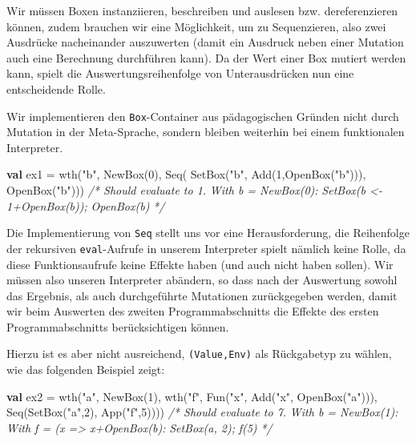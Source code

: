 \documentclass[]{article}
\newenvironment{Shaded}{}{}
\newcommand{\CommentTok}[1]{\textcolor[rgb]{0.38,0.63,0.69}{\textit{#1}}}
\newcommand{\DecValTok}[1]{\textcolor[rgb]{0.25,0.63,0.44}{#1}}
\newcommand{\FunctionTok}[1]{\textcolor[rgb]{0.02,0.16,0.49}{#1}}
\newcommand{\KeywordTok}[1]{\textcolor[rgb]{0.00,0.44,0.13}{\textbf{#1}}}
\newcommand{\NormalTok}[1]{#1}
\newcommand{\StringTok}[1]{\textcolor[rgb]{0.25,0.44,0.63}{#1}}
\begin{document}
Wir müssen Boxen instanziieren, beschreiben und auslesen bzw.
dereferenzieren können, zudem brauchen wir eine Möglichkeit, um zu
Sequenzieren, also zwei Ausdrücke nacheinander auszuwerten (damit ein
Ausdruck neben einer Mutation auch eine Berechnung durchführen kann). Da
der Wert einer Box mutiert werden kann, spielt die
Auswertungsreihenfolge von Unterausdrücken nun eine entscheidende Rolle.

Wir implementieren den \texttt{Box}-Container aus pädagogischen Gründen
nicht durch Mutation in der Meta-Sprache, sondern bleiben weiterhin bei
einem funktionalen Interpreter.

\begin{Shaded}
\begin{Highlighting}[]
\KeywordTok{val}\NormalTok{ ex1 = }\FunctionTok{wth}\NormalTok{(}\StringTok{"b"}\NormalTok{, }\FunctionTok{NewBox}\NormalTok{(}\DecValTok{0}\NormalTok{), Seq( }\FunctionTok{SetBox}\NormalTok{(}\StringTok{"b"}\NormalTok{, }\FunctionTok{Add}\NormalTok{(}\DecValTok{1}\NormalTok{,}\FunctionTok{OpenBox}\NormalTok{(}\StringTok{"b"}\NormalTok{))), }\FunctionTok{OpenBox}\NormalTok{(}\StringTok{"b"}\NormalTok{)))}
\CommentTok{/* Should evaluate to 1.}
\CommentTok{With b = NewBox(0):}
\CommentTok{  SetBox(b \textless{}{-} 1+OpenBox(b));}
\CommentTok{    OpenBox(b)}
\CommentTok{ */}
\end{Highlighting}
\end{Shaded}

Die Implementierung von \texttt{Seq} stellt uns vor eine
Herausforderung, die Reihenfolge der rekursiven \texttt{eval}-Aufrufe in
unserem Interpreter spielt nämlich keine Rolle, da diese
Funktionsaufrufe keine Effekte haben (und auch nicht haben sollen). Wir
müssen also unseren Interpreter abändern, so dass nach der Auswertung
sowohl das Ergebnis, als auch durchgeführte Mutationen zurückgegeben
werden, damit wir beim Auswerten des zweiten Programmabschnitts die
Effekte des ersten Programmabschnitts berücksichtigen können.

Hierzu ist es aber nicht ausreichend, \texttt{(Value,Env)} als
Rückgabetyp zu wählen, wie das folgenden Beispiel zeigt:

\begin{Shaded}
\begin{Highlighting}[]
\KeywordTok{val}\NormalTok{ ex2 = }\FunctionTok{wth}\NormalTok{(}\StringTok{"a"}\NormalTok{, }\FunctionTok{NewBox}\NormalTok{(}\DecValTok{1}\NormalTok{), }
            \FunctionTok{wth}\NormalTok{(}\StringTok{"f"}\NormalTok{, }\FunctionTok{Fun}\NormalTok{(}\StringTok{"x"}\NormalTok{, }\FunctionTok{Add}\NormalTok{(}\StringTok{"x"}\NormalTok{, }\FunctionTok{OpenBox}\NormalTok{(}\StringTok{"a"}\NormalTok{))),}
\NormalTok{              Seq(}\FunctionTok{SetBox}\NormalTok{(}\StringTok{"a"}\NormalTok{,}\DecValTok{2}\NormalTok{), }\FunctionTok{App}\NormalTok{(}\StringTok{"f"}\NormalTok{,}\DecValTok{5}\NormalTok{))))}
\CommentTok{/* Should evaluate to 7.}
\CommentTok{With b = NewBox(1):}
\CommentTok{  With f = (x =\textgreater{} x+OpenBox(b):}
\CommentTok{    SetBox(a, 2);}
\CommentTok{    f(5)}
\CommentTok{ */}
\end{Highlighting}
\end{Shaded}
\end{document}
